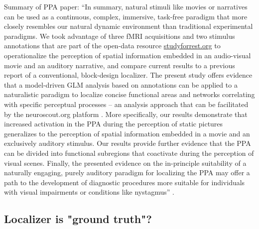 


Summary of PPA paper:
``In summary, natural stimuli like movies \citep{eickhoff2020towards,
hasson2008neurocinematics, sonkusare2019naturalistic} or narratives
\citep{hamilton2018revolution, honey2012not, lerner2011topographic,
silbert2014coupled, wilson2008beyond} can be used as a continuous, complex,
immersive, task-free paradigm that more closely resembles our natural dynamic
environment than traditional experimental paradigms.
We took advantage of three fMRI acquisitions and two stimulus annotations that
are part of the open-data resource
\href{http://www.studyforrest.org}{studyforrest.org} to operationalize the
perception of spatial information embedded in an audio-visual movie and an
auditory narrative, and compare current results to a previous report of a
conventional, block-design localizer.
The present study offers evidence that a model-driven GLM analysis based on
annotations can be applied to a naturalistic paradigm to localize concise
functional areas and networks correlating with specific perceptual processes --
an analysis approach that can be facilitated by the neuroscout.org platform
\citep{delavega2021neuroscout}.
More specifically, our results demonstrate that increased activation in the PPA
during the perception of static pictures generalizes to the perception of
spatial information embedded in a movie and an exclusively auditory stimulus.
Our results provide further evidence that the PPA can be divided into functional
subregions that coactivate during the perception of visual scenes.
Finally, the presented evidence on the in-principle suitability of a naturally
engaging, purely auditory paradigm for localizing the PPA may offer a path to
the development of diagnostic procedures more suitable for individuals with
visual impairments or conditions like nystagmus''
\citep{haeusler2022processing}.


\subsection{Localizer is "ground truth"?}

